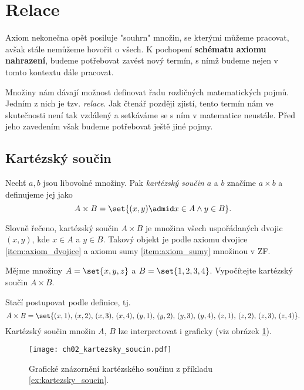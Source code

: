 \section{Relace}\label{sec:relace}
Axiom nekonečna opět posiluje "souhrn" množin, se kterými můžeme pracovat, avšak stále nemůžeme hovořit o všech. K pochopení \textbf{schématu axiomu nahrazení}, budeme potřebovat zavést nový termín, s nímž budeme nejen v tomto kontextu dále pracovat.\par
Množiny nám dávají možnost definovat řadu rozličných matematických pojmů. Jedním z nich je tzv. \emph{relace}. Jak čtenář později zjistí, tento termín nám ve skutečnosti není tak vzdálený a setkáváme se s ním v matematice neustále. Před jeho zavedením však budeme potřebovat ještě jiné pojmy.

\subsection{Kartézský součin}
\begin{definition}
    Nechť $a,b$ jsou libovolné množiny. Pak \emph{kartézský součin} $a$ a $b$ značíme $a\times b$ a definujeme jej jako
    \begin{equation*}
        A\times B=\set{(x,y) \admid x\in A \land y\in B}.
    \end{equation*}
\end{definition}
Slovně řečeno, kartézský součin $A\times B$ je množina všech uspořádaných dvojic $(x,y)$, kde $x\in A$ a $y\in B$. Takový objekt je podle axiomu dvojice \ref{item:axiom_dvojice} a axiomu sumy \ref{item:axiom_sumy} množinou v \textsf{ZF}.
\begin{example}\label{ex:kartezsky_soucin}
    Mějme množiny $A=\set{x,y,z}$ a $B=\set{1,2,3,4}$. Vypočítejte kartézský součin $A\times B$.
\end{example}
\begin{solution}
    Stačí postupovat podle definice, tj.
    \begin{equation*}
        A\times B=\set{(x,1),\,(x,2),\,(x,3),\,(x,4),\,(y,1),\,(y,2),\,(y,3),\,(y,4),\,(z,1),\,(z,2),\,(z,3),\,(z,4)}.
    \end{equation*}
    Kartézský součin množin $A,\,B$ lze interpretovat i graficky (viz obrázek \ref{fig:kartezsky_soucin}).
\end{solution}
\begin{figure}[H]
    \centering
    \texttt{[image: ch02\_kartezsky\_soucin.pdf]}
    \caption{Grafické znázornění kartézského součinu z příkladu \ref{ex:kartezsky_soucin}.}
    \label{fig:kartezsky_soucin}
\end{figure}
